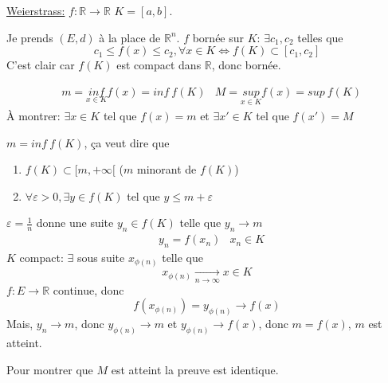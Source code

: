 \documentclass[a4paper]{report}
\newcommand\R{\ensuremath{\mathbb{R}}}
\let\iff\Leftrightarrow
\let\epsilon\varepsilon
\theoremstyle{definition}
\begin{document}
\begin{preuve}
    \underline{Weierstrass:} $f: \R \to \R$ $K = [a, b]$. \par
    Je prends  $(E, d)$ à la place de  $\R^n$. $f$ bornée sur  $K$:  $\exists c_1, c_2$ telles que 
    \[
    c_1 \le f(x) \le c_2, \forall x \in K \iff f(K) \subset [c_1, c_2] 
\] 
    C'est clair car $f(K)$ est compact dans  $\R$, donc  bornée.
    \par
    \begin{align*}
        &m = \underset{x \in K}{inf} f(x) = inf \: f(K) &M = \underset{x \in K}{sup} f(x) = sup \: f(K)
    \end{align*}
    À montrer: $\exists x \in K$ tel que $f(x) = m$ et  $\exists x' \in K$ tel que $f(x') = M$
    \par
     $m = inf \: f(K)$, ça veut dire que 
      \begin{enumerate}
          \item $f(K) \subset [m, +\infty[$ ($m$ minorant de  $f(K)$)
          \item $\forall \epsilon > 0, \exists y \in f(K)$ tel que $y \le m + \epsilon$
     \end{enumerate}
     $\epsilon = \frac{1}{n}$ donne une suite $y_n \in f(K)$ telle que $y_n \to m$
     \begin{align*}
         &y_n = f(x_n) &x_n \in K
     \end{align*}
     $K$ compact:   $\exists$ sous suite     $x_{\phi(n)}$ telle que 
      \[
      x_{\phi(n)} \xrightarrow[n \to \infty]{} x \in K
      \] 
     $f: E \to \R$ continue, donc 
     \[
         f(x_{\phi(n)}) = y_{\phi(n)} \to f(x) 
     \] 
     Mais, $y_n \to m$, donc $y_{\phi(n)} \to m$ et $y_{\phi(n)} \to f(x)$, donc $m = f(x)$,  $m$ est atteint.
     \par
     Pour montrer que $M$ est atteint la preuve est identique.
\end{preuve}
\end{document}
